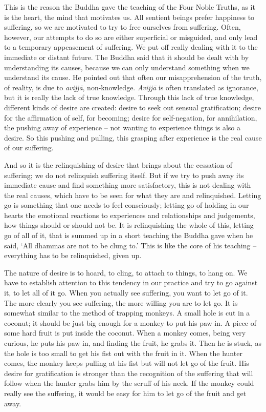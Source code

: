 This is the reason the Buddha gave the teaching of the Four Noble
Truths, as it is the heart, the mind that motivates us. All sentient
beings prefer happiness to suffering, so we are motivated to try to free
ourselves from suffering. Often, however, our attempts to do so are
either superficial or misguided, and only lead to a temporary
appeasement of suffering. We put off really dealing with it to the
immediate or distant future. The Buddha said that it should be dealt
with by understanding its causes, because we can only understand
something when we understand its cause. He pointed out that often our
misapprehension of the truth, of reality, is due to \emph{avijjā}, 
non-knowledge. \emph{Avijjā} is often translated as ignorance, but it is
really the lack of true knowledge. Through this lack of true knowledge, 
different kinds of desire are created: desire to seek out sensual
gratification; desire for the affirmation of self, for becoming; desire
for self-negation, for annihilation, the pushing away of experience --
not wanting to experience things is also a desire. So this pushing and
pulling, this grasping after experience is the real cause of our
suffering. 

And so it is the relinquishing of desire that brings about the cessation
of suffering; we do not relinquish suffering itself. But if we try to
push away its immediate cause and find something more satisfactory, this
is not dealing with the real causes, which have to be seen for what they
are and relinquished. Letting go is something that one needs to feel
consciously; letting go of holding in our hearts the emotional reactions
to experiences and relationships and judgements, how things should or
should not be. It is relinquishing the whole of this, letting go of all
of it, that is summed up in a short teaching the Buddha gave when he
said, `All dhammas are not to be clung to.' This is like the core of his
teaching -- everything has to be relinquished, given up. 

The nature of desire is to hoard, to cling, to attach to things, to hang
on. We have to establish attention to this tendency in our practice and
try to go against it, to let all of it go. When you actually see
suffering, you want to let go of it. The more clearly you see suffering, 
the more willing you are to let go. It is somewhat similar to the method
of trapping monkeys. A small hole is cut in a coconut; it should be just
big enough for a monkey to put his paw in. A piece of some hard fruit is
put inside the coconut. When a monkey comes, being very curious, he puts
his paw in, and finding the fruit, he grabs it. Then he is stuck, as the
hole is too small to get his fist out with the fruit in it. When the
hunter comes, the monkey keeps pulling at his fist but will not let go
of the fruit. His desire for gratification is stronger than the
recognition of the suffering that will follow when the hunter grabs him
by the scruff of his neck. If the monkey could really see the suffering, 
it would be easy for him to let go of the fruit and get away. 

